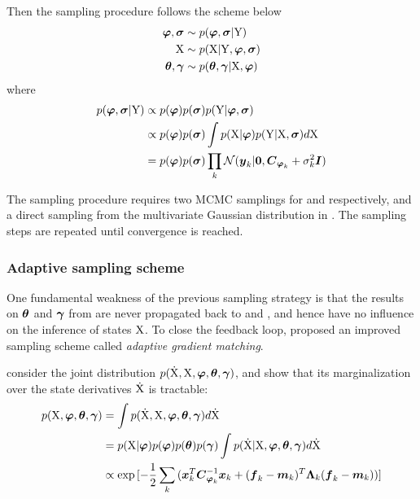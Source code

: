 Then the sampling procedure follows the scheme below
\begin{align}
    \boldsymbol{\varphi},\boldsymbol{\sigma} 
    & \sim p(\boldsymbol{\varphi},\boldsymbol{\sigma}\vert\mathrm{Y})
    \label{eq-gmgp-sample-1}
    \\
    \mathrm{X} 
    & \sim p(\mathrm{X}\vert\mathrm{Y},\boldsymbol{\varphi},\boldsymbol{\sigma})
    \label{eq-gmgp-sample-2}
    \\
    \boldsymbol{\theta},\boldsymbol{\gamma} 
    & \sim p(\boldsymbol{\theta},\boldsymbol{\gamma}\vert\mathrm{X},\boldsymbol{\varphi})
    \label{eq-gmgp-sample-3}    
\end{align}
where 
\begin{align}
    p(\boldsymbol{\varphi}, \boldsymbol{\sigma}\vert\mathrm{Y}) 
    & \propto p(\boldsymbol{\varphi})p(\boldsymbol{\sigma})p(\mathrm{Y}\vert\boldsymbol{\varphi},\boldsymbol{\sigma}) 
    \nonumber
    \\
    & \propto p(\boldsymbol{\varphi})p(\boldsymbol{\sigma})\int{p(\mathrm{X}\vert\boldsymbol{\ensuremath{\varphi}})p(\mathrm{Y}\vert\mathrm{X},\boldsymbol{\sigma})d\mathrm{X}}
    \nonumber
    \\
    & = p(\boldsymbol{\varphi})p(\boldsymbol{\sigma})\prod_k{\mathcal{N}(\boldsymbol{y}_{k}\vert\boldsymbol{0}, \boldsymbol{C}_{\boldsymbol{\varphi}_{k}} + \sigma_{k}^2\boldsymbol{I})}    
    \nonumber
\end{align}

The sampling procedure requires two MCMC samplings for  and  respectively, and a direct sampling from the multivariate Gaussian distribution in .
The sampling steps are repeated until convergence is reached.

\subsubsection*{Adaptive sampling scheme}
One fundamental weakness of the previous sampling strategy is that the results on $\boldsymbol{\theta}$ and $\boldsymbol{\gamma}$ from  are never propagated back to  and , and hence have no influence on the inference of states $\mathrm{X}$.
To close the feedback loop, \cite{dondelinger2013ode} proposed an improved sampling scheme called \emph{adaptive gradient matching}.

\cite{dondelinger2013ode} consider the joint distribution $p(\mathrm{\dot{X}},\mathrm{X},\boldsymbol{\varphi},\boldsymbol{\theta},\boldsymbol{\gamma})$, and show that its marginalization over the state derivatives $\mathrm{\dot{X}}$ is tractable:
\begin{align}
    p(\mathrm{X},\boldsymbol{\varphi},\boldsymbol{\theta},\boldsymbol{\gamma})
    & = \int{
        p(\mathrm{\dot{X}},\mathrm{X},\boldsymbol{\ensuremath{\varphi}},\boldsymbol{\theta},\boldsymbol{\gamma}) d\mathrm{\dot{X}}}
    \nonumber
    \\
    & = p(\mathrm{X}\vert\boldsymbol{\varphi}) p(\boldsymbol{\varphi}) p(\boldsymbol{\theta}) p(\boldsymbol{\gamma}) \int{
        p(\mathrm{\dot{X}}\vert\mathrm{X},\boldsymbol{\ensuremath{\varphi}},\boldsymbol{\theta},\boldsymbol{\gamma}) d\mathrm{\dot{X}}}
    \nonumber
    \\
    & \propto \exp{[
        -\frac{1}{2}\sum_k{
            (\boldsymbol{x}_{k}^T\boldsymbol{C}_{\boldsymbol{\ensuremath{\varphi}}_{k}}^{-1}\boldsymbol{x}_{k} + (\boldsymbol{f}_{k} - \boldsymbol{m}_{k})^T\boldsymbol{\Lambda}_{k}(\boldsymbol{f}_{k} - \boldsymbol{m}_{k}))}]}
\end{align}

